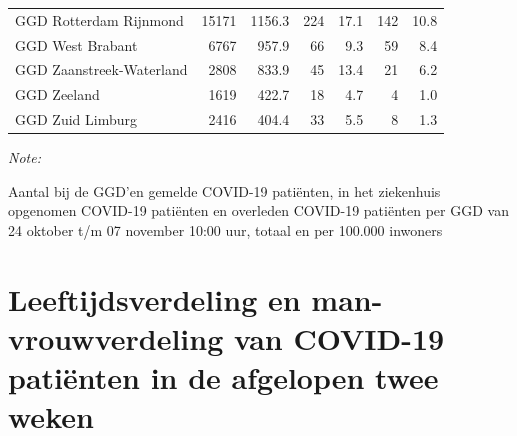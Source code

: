\documentclass[
  english,
  man,floatsintext]{apa6}
\begin{document}
\begin{table}[H]
\begin{threeparttable}
\begin{tabular}{lrrrrrr}
GGD Rotterdam Rijnmond & 15171 & 1156.3 & 224 & 17.1 & 142 & 10.8\\
GGD West Brabant & 6767 & 957.9 & 66 & 9.3 & 59 & 8.4\\
GGD Zaanstreek-Waterland & 2808 & 833.9 & 45 & 13.4 & 21 & 6.2\\
GGD Zeeland & 1619 & 422.7 & 18 & 4.7 & 4 & 1.0\\
GGD Zuid Limburg & 2416 & 404.4 & 33 & 5.5 & 8 & 1.3\\
\bottomrule
\end{tabular}
\begin{tablenotes}
\item \textit{Note: } 
\item Aantal bij de GGD’en gemelde COVID-19 patiënten, in het ziekenhuis opgenomen COVID-19 patiënten en overleden COVID-19 patiënten per GGD van 24 oktober t/m 07 november 10:00 uur, totaal en per 100.000 inwoners
\end{tablenotes}
\end{threeparttable}
\endgroup{}
\end{table}

\newpage

\hypertarget{leeftijdsverdeling-en-man-vrouwverdeling-van-covid-19-patiuxebnten-in-de-afgelopen-twee-weken}{%
\section{Leeftijdsverdeling en man-vrouwverdeling van COVID-19 patiënten in de afgelopen twee weken}\label{leeftijdsverdeling-en-man-vrouwverdeling-van-covid-19-patiuxebnten-in-de-afgelopen-twee-weken}}
\end{document}
